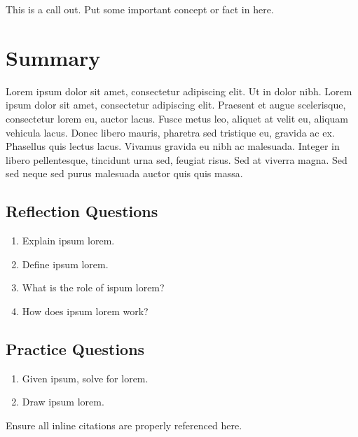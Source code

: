 \documentclass[
]{book}
\providecommand{\tightlist}{%
  \setlength{\itemsep}{0pt}\setlength{\parskip}{0pt}}
\begin{document}
This is a call out. Put some important concept or fact in here.

\hypertarget{summary-1}{%
\section{Summary}\label{summary-1}}

Lorem ipsum dolor sit amet, consectetur adipiscing elit. Ut in dolor nibh. Lorem ipsum dolor sit amet, consectetur adipiscing elit. Praesent et augue scelerisque, consectetur lorem eu, auctor lacus. Fusce metus leo, aliquet at velit eu, aliquam vehicula lacus. Donec libero mauris, pharetra sed tristique eu, gravida ac ex. Phasellus quis lectus lacus. Vivamus gravida eu nibh ac malesuada. Integer in libero pellentesque, tincidunt urna sed, feugiat risus. Sed at viverra magna. Sed sed neque sed purus malesuada auctor quis quis massa.

\hypertarget{reflection-questions}{%
\subsection*{Reflection Questions}\label{reflection-questions}}

\begin{enumerate}
\def\labelenumi{\arabic{enumi}.}
\tightlist
\item
  Explain ipsum lorem.
\item
  Define ipsum lorem.
\item
  What is the role of ispum lorem?
\item
  How does ipsum lorem work?
\end{enumerate}

\hypertarget{practice-questions}{%
\subsection*{Practice Questions}\label{practice-questions}}

\begin{enumerate}
\def\labelenumi{\arabic{enumi}.}
\setcounter{enumi}{1}
\tightlist
\item
  Given ipsum, solve for lorem.
\item
  Draw ipsum lorem.
\end{enumerate}

Ensure all inline citations are properly referenced here.
\end{document}
